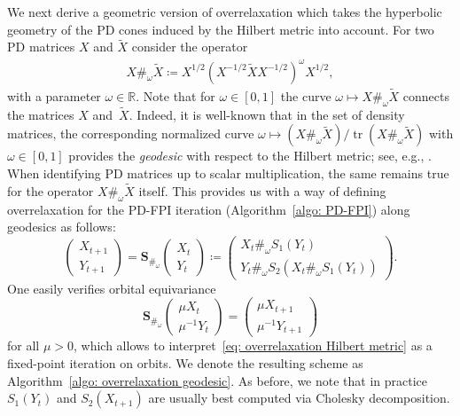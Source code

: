 \documentclass[a4paper]{article}
\newcommand{\R}{\mathbb{R}}
\newcommand{\bS}{\mathbf{S}}
\DeclareMathOperator{\tr}{tr}
\theoremstyle{definition}
\numberwithin{equation}{section}
\begin{document}
We next derive a geometric version of overrelaxation which takes the hyperbolic geometry of the PD cones induced by the Hilbert metric into account. For two PD matrices $X$ and $\tilde X$ consider the operator
\begin{align}\label{eq:sharp}
 X \#_\omega \tilde X \coloneqq X^{1/2}(X^{-1/2}\tilde X X^{-1/2})^\omega X^{1/2},
\end{align}
with a parameter $\omega \in \R$. Note that for $\omega \in [0,1]$ the curve $\omega \mapsto X \#_\omega \tilde X$ connects the matrices $X$ and~$\tilde X$. Indeed, it is well-known that in the set of density matrices, the corresponding normalized curve $\omega \mapsto (X \#_\omega \tilde X) / \tr(X \#_\omega \tilde X)$ with $\omega \in [0,1]$ provides the \emph{geodesic} with respect to the Hilbert metric; see, e.g., \cite[Proposition~2.6.8]{Lemmens2012}. When identifying PD matrices up to scalar multiplication, the same remains true for the operator $X \#_\omega \tilde X$ itself. This provides us with a way of defining overrelaxation for the PD-FPI iteration (Algorithm~\ref{algo: PD-FPI}) along geodesics as follows:
\begin{equation}\label{eq: overrelaxation Hilbert metric}
 \begin{pmatrix} X_{t+1} \\ Y_{t+1} \end{pmatrix} = \bS_{\#_\omega}\!\begin{pmatrix} X_t \\ Y_t \end{pmatrix} \coloneqq \begin{pmatrix} X_t \#_\omega S_1(Y_t) \\ Y_t \#_\omega S_2(X_t \#_\omega S_1(Y_t)) \end{pmatrix}.
\end{equation}
One easily verifies orbital equivariance
\begin{equation}\label{eq: orbital equivariance geodesic}
 \bS_{\#_\omega}\!\begin{pmatrix} \mu X_t \\ \mu^{-1} Y_t \end{pmatrix} = \begin{pmatrix} \mu X_{t+1} \\ \mu^{-1} Y_{t+1} \end{pmatrix}
\end{equation}
for all $\mu > 0$, which allows to interpret~\eqref{eq: overrelaxation Hilbert metric} as a fixed-point iteration on orbits. We denote the resulting scheme as Algorithm~\ref{algo: overrelaxation geodesic}. As before, we note that in practice $S_1(Y_t)$ and $S_2(X_{t+1})$ are usually best computed via Cholesky decomposition. 
\end{document}

